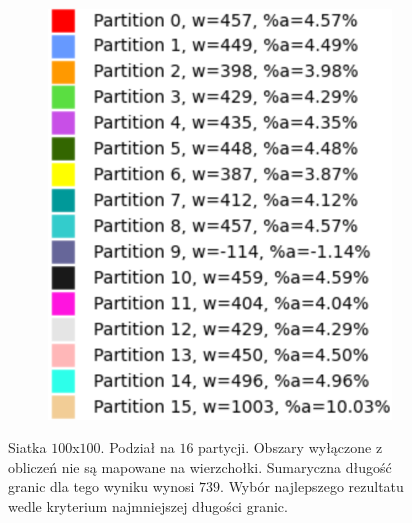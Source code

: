 \begin{figure}[h]
\begin{subfigure}{.33\textwidth}
    \caption[short]{}
\end{subfigure}%
\begin{subfigure}{.33\textwidth}
    \centering
    \includegraphics[width=0.9\linewidth]{images/results/m_k/with/18/results}
    \caption[short]{}
\end{subfigure}
\caption{Siatka $100$x$100$. Podział na $16$ partycji.
Obszary wyłączone z obliczeń nie są mapowane na wierzchołki.
Sumaryczna długość granic dla tego wyniku wynosi $739$.
Wybór najlepszego rezultatu wedle kryterium najmniejszej długości granic.}
\label{result:18}
\end{figure}
\FloatBarrier
